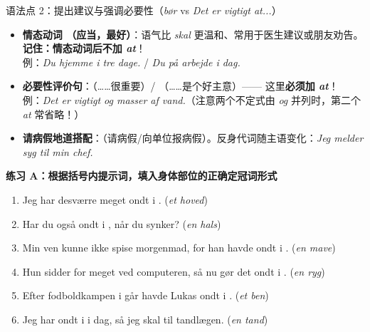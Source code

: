 \begin{grammatikbox}{语法点 2：提出建议与强调必要性（\textit{bør} vs \textit{Det er vigtigt at...}）}
\begin{itemize}
  \item \textbf{情态动词 （应当，最好）}：语气比 \textit{skal} 更温和、常用于医生建议或朋友劝告。\textbf{记住：情态动词后不加 \textit{at}}！\\
    例：\textit{Du  hjemme i tre dage.} / \textit{Du  på arbejde i dag.}
  \item \textbf{必要性评价句}：（……很重要）/ （……是个好主意）—— 这里\textbf{必须加 \textit{at}}！\\
    例：\textit{Det er vigtigt  og  masser af vand.}（注意两个不定式由 \textit{og} 并列时，第二个 \textit{at} 常省略！）
  \item \textbf{请病假地道搭配}：（请病假/向单位报病假）。反身代词随主语变化：\textit{Jeg melder  syg til min chef.}
\end{itemize}
\end{grammatikbox}


\textbf{练习 A：根据括号内提示词，填入身体部位的正确定冠词形式}
\begin{enumerate}
  \item Jeg har desværre meget ondt i \underline{\hspace{2.2cm}}. (\textit{et hoved})
  \item Har du også ondt i \underline{\hspace{2.2cm}}, når du synker? (\textit{en hals})
  \item Min ven kunne ikke spise morgenmad, for han havde ondt i \underline{\hspace{2.2cm}}. (\textit{en mave})
  \item Hun sidder for meget ved computeren, så nu gør det ondt i \underline{\hspace{2.2cm}}. (\textit{en ryg})
  \item Efter fodboldkampen i går havde Lukas ondt i \underline{\hspace{2.2cm}}. (\textit{et ben})
  \item Jeg har ondt i \underline{\hspace{2.2cm}} i dag, så jeg skal til tandlægen. (\textit{en tand})
\end{enumerate}

